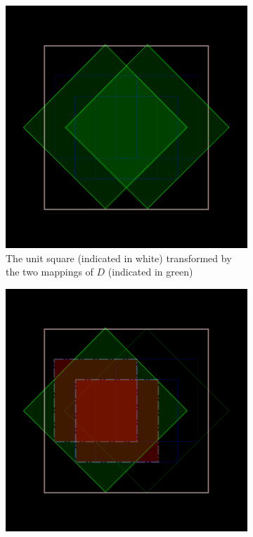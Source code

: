 \documentclass[11pt]{article}
\begin{document}
\begin{enumerate}
\begin{figure}
     \centering
     \begin{subfigure}[b]{0.4\textwidth}
         \centering
         \includegraphics[width=\textwidth]{figures/dragon_curve_a}
         \caption{The unit square (indicated in white) transformed by the two mappings of $D$ (indicated in green)}
         \label{figure:dragon_curve_a}
     \end{subfigure}
     \hfill
     \begin{subfigure}[b]{0.4\textwidth}
         \centering
         \includegraphics[width=\textwidth]{figures/dragon_curve_b}

\end{subfigure}
\end{figure}
\end{enumerate}
\end{document}
